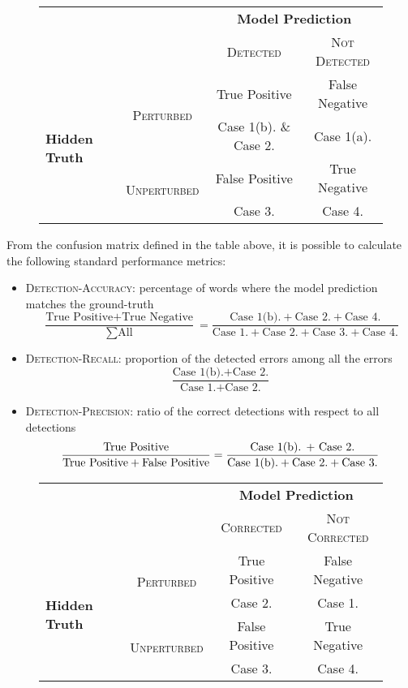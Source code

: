 \begin{figure}[H]
	\centering
	\begin{tabular}{lc|cc}
		\toprule
		& & \multicolumn{2}{c}{\textbf{Model Prediction}}\\
		& & \textsc{Detected}  & \textsc{Not Detected} \\
		\midrule
		\multirow{4}{*}{\textbf{Hidden Truth}} 
		& \multirow{2}{*}{\textsc{Perturbed}}   & True Positive & False Negative	\\ 
		& &  Case 1(b). \& Case 2. & Case 1(a).	\\ 
		& \multirow{2}{*}{\textsc{Unperturbed}}  & False Positive & True Negative	\\
		& &  Case 3.  & Case 4.	\\ 
		\bottomrule
	\end{tabular}
	\label{tab:confmat-detection}
\end{figure}

From the confusion matrix defined in the table above, it is possible to calculate the following standard performance 
metrics:
\begin{itemize}
	\item \textsc{Detection-Accuracy}: percentage of words where the model prediction matches the 
	ground-truth  
	\[ \frac{\mbox{True Positive} + \mbox{True Negative}}{\sum \mbox{All}} = \frac{\mbox{Case 1(b).} + 
	\mbox{Case 2.} + \mbox{Case 4.}}{\mbox{Case 1.} + \mbox{Case 2.} + \mbox{Case 3.} + \mbox{Case 4.}}\]
	\item \textsc{Detection-Recall}: proportion of the detected errors among all the errors
	\[ \frac{\mbox{Case 1(b).} + \mbox{Case 2.}}{\mbox{Case 1.} + \mbox{Case 2.}}\]
	\item \textsc{Detection-Precision}: ratio of the correct detections with respect to all detections
		\[ \frac{\mbox{True Positive}}{\mbox{True Positive} + \mbox{False Positive}} = \frac{\mbox{Case 1(b). + 
		\mbox{Case 2.}}}{\mbox{Case 1(b).}+  \mbox{Case 2.} + \mbox{Case 3.}}\]
\end{itemize}

\begin{figure}[H]
	\centering
	\begin{tabular}{lc|cc}
		\toprule
		& & \multicolumn{2}{c}{\textbf{Model Prediction}}\\
		& & \textsc{Corrected}  & \textsc{Not Corrected} \\
		\midrule
		\multirow{4}{*}{\textbf{Hidden Truth}} 
		& \multirow{2}{*}{\textsc{Perturbed}}   & True Positive & False Negative	\\ 
			& & Case 2. & Case 1.	\\ 
		& \multirow{2}{*}{\textsc{Unperturbed}}  & False Positive & True Negative	\\
		& &  Case 3.  & Case 4.	\\ 
		\bottomrule
	\end{tabular}
	\label{tab:confma-error}
\end{figure}

